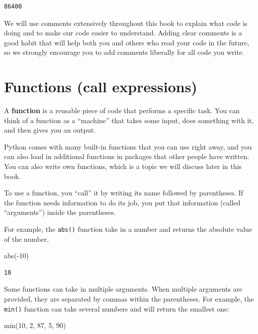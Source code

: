 \documentclass[
  letterpaper,
  DIV=11,
  numbers=noendperiod]{scrreprt}
\newenvironment{Shaded}{\begin{snugshade}}{\end{snugshade}}
\newcommand{\BuiltInTok}[1]{\textcolor[rgb]{0.00,0.23,0.31}{#1}}
\newcommand{\DecValTok}[1]{\textcolor[rgb]{0.68,0.00,0.00}{#1}}
\newcommand{\NormalTok}[1]{\textcolor[rgb]{0.00,0.23,0.31}{#1}}
\newcommand{\OperatorTok}[1]{\textcolor[rgb]{0.37,0.37,0.37}{#1}}
\begin{document}
\begin{verbatim}
86400
\end{verbatim}

We will use comments extensively throughout this book to explain what
code is doing and to make our code easier to understand. Adding clear
comments is a good habit that will help both you and others who read
your code in the future, so we strongly encourage you to add comments
liberally for all code you write.

\section{Functions (call expressions)}\label{functions-call-expressions}

A \textbf{function} is a reusable piece of code that performs a specific
task. You can think of a function as a ``machine'' that takes some
input, does something with it, and then gives you an output.

Python comes with many built-in functions that you can use right away,
and you can also load in additional functions in packages that other
people have written. You can also write own functions, which is a topic
we will discuss later in this book.

To use a function, you ``call'' it by writing its name followed by
parentheses. If the function needs information to do its job, you put
that information (called ``arguments'') inside the parentheses.

For example, the \texttt{abs()} function take in a number and returns
the absolute value of the number.

\begin{Shaded}
\begin{Highlighting}[]
\BuiltInTok{abs}\NormalTok{(}\OperatorTok{{-}}\DecValTok{10}\NormalTok{)}
\end{Highlighting}
\end{Shaded}

\begin{verbatim}
10
\end{verbatim}

Some functions can take in multiple arguments. When multiple arguments
are provided, they are separated by commas within the parentheses. For
example, the \texttt{min()} function can take several numbers and will
return the smallest one:

\begin{Shaded}
\begin{Highlighting}[]
\BuiltInTok{min}\NormalTok{(}\DecValTok{10}\NormalTok{, }\DecValTok{2}\NormalTok{, }\DecValTok{87}\NormalTok{, }\DecValTok{5}\NormalTok{, }\DecValTok{90}\NormalTok{)}
\end{Highlighting}
\end{Shaded}
\end{document}
